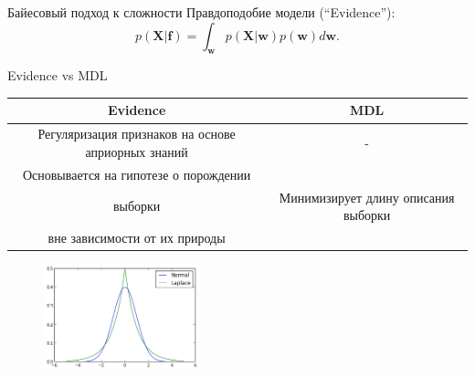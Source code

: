 \documentclass[10pt,pdf,utf8,russian,aspectratio=169]{beamer}
\begin{document}
\begin{frame}{Байесовый подход к сложности}
Правдоподобие модели (``Evidence''):
\[
	p(\mathbf{X}|\mathbf{f}) = \int_\mathbf{w} p(\mathbf{X}|\mathbf{w})p(\mathbf{w}) d\mathbf{w}.
\]


\begin{figure}
  \centering
\label{fig:1}\qquad

\end{figure}


\end{frame}

\begin{frame}{Evidence vs MDL}
\begin{tabular}{ c | c  }
  \hline			
  Evidence & MDL \\
  \hline  
Регуляризация признаков на основе априорных знаний &  - \\
  \hline  
Основывается на гипотезе о порождении\\ выборки & Минимизирует длину описания выборки\\ вне зависимости от их природы \\
  \hline  

\end{tabular}


\begin{figure}
  \centering
 \includegraphics[width=0.4\textwidth]{laplace.png}
\label{fig:1}\qquad

\end{figure}
\end{frame}
\end{document}
